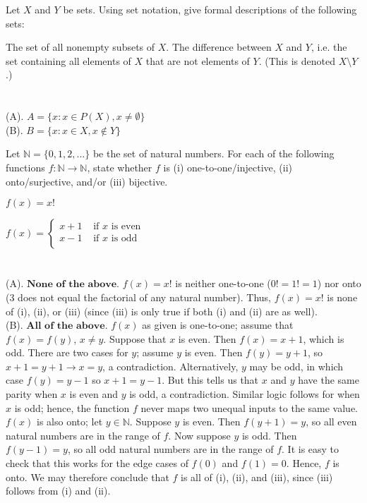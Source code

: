 \documentclass[solution, letterpaper]{cs121}
\begin{document}


Let $X$ and $Y$ be sets. Using set notation, give formal descriptions of the following sets:

\subproblem The set of all nonempty subsets of $X$.
\subproblem The difference between $X$ and $Y$, i.e. the set containing all elements of $X$ that are not elements of $Y$. (This is denoted $X \setminus Y$.)
\\\\
\\(A). $A = \{x: x \in P(X), x \neq \emptyset\}$
\\(B). $B = \{x: x \in X, x \notin Y\}$

Let $\mathbb{N} = \{0, 1, 2, ... \}$ be the set of natural numbers. For each of the following functions $f : \mathbb{N} \to \mathbb{N}$, state whether $f$ is (i) one-to-one/injective, (ii) onto/surjective, and/or (iii) bijective.

\subproblem $f(x) = x!$

\subproblem $f(x) = \begin{cases} 
      x + 1 & \text{ if } x \text{ is even } \\
      x - 1 & \text{ if } x \text{ is odd } \\
   \end{cases}$
\\\\
\\(A). $\textbf{None of the above.}$ $f(x) = x!$ is neither one-to-one ($0! = 1! = 1$) nor onto ($3$ does not equal the factorial of any natural number).  Thus, $f(x)=x!$ is none of (i), (ii), or (iii) (since (iii) is only true if both (i) and (ii) are as well).
\\(B). $\textbf{All of the above.}$  $f(x)$ as given is one-to-one; assume that $f(x) = f(y)$, $x \neq y$.  Suppose that $x$ is even.  Then $f(x) = x+1$, which is odd.  There are two cases for $y$; assume $y$ is even.  Then $f(y) = y+1$, so $x+1 = y+1 \rightarrow x=y$, a contradiction.  Alternatively, $y$ may be odd, in which case $f(y) = y-1$ so $x+1 = y-1$.  But this tells us that $x$ and $y$ have the same parity when $x$ is even and $y$ is odd, a contradiction.  Similar logic follows for when $x$ is odd; hence, the function $f$ never maps two unequal inputs to the same value.
\\\indent$f(x)$ is also onto; let $y \in \mathbb{N}$.  Suppose $y$ is even.  Then $f(y+1) = y$, so all even natural numbers are in the range of $f$.  Now suppose $y$ is odd.  Then $f(y-1) = y$, so all odd natural numbers are in the range of $f$.  It is easy to check that this works for the edge cases of $f(0)$ and $f(1) = 0$.  Hence, $f$ is onto.  We may therefore conclude that $f$ is all of (i), (ii), and (iii), since (iii) follows from (i) and (ii).
\end{document}
